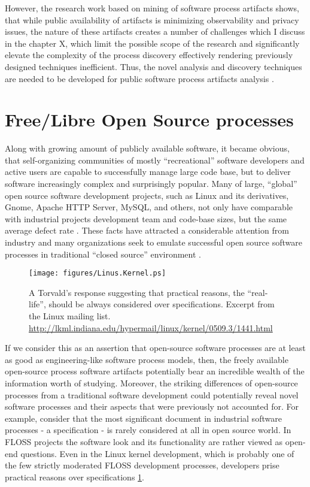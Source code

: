 However, the research work based on mining of software process artifacts shows, that while public availability 
of artifacts is minimizing observability and privacy issues, the nature of these artifacts creates a number of 
challenges which I discuss in the chapter X, which limit the possible scope of the research and significantly 
elevate the complexity of the process discovery effectively rendering previously designed techniques inefficient.
Thus, the novel analysis and discovery techniques are needed to be developed for public software process artifacts 
analysis \cite{citeulike:7853299}.

\section{Free/Libre Open Source processes}\label{floss_processes}
Along with growing amount of publicly available software, it became obvious, that self-organizing communities of 
mostly ``recreational'' software developers and active users are capable to successfully manage large code base, 
but to deliver software increasingly complex and surprisingly popular.
Many of large, ``global'' open source software development projects, such as Linux and its derivatives, 
Gnome, Apache HTTP Server, MySQL, and others, not only have comparable with industrial projects development team 
and code-base sizes, but the same average defect rate \cite{coverity2012}. 
These facts have attracted a considerable attention from industry and many organizations 
seek to emulate successful open source software processes in traditional ``closed source'' environment 
\cite{oss_virtual_organizations} \cite{oss_balance} \cite{oss_hp} \cite{oss_4industry}. 

\begin{figure}[ht!]
   \centering
   \texttt{[image: figures/Linus.Kernel.ps]}
   \caption{A Torvald's response suggesting that practical reasons, the ``real-life'', should be always considered 
   over specifications.
   Excerpt from the Linux mailing list. \url{http://lkml.indiana.edu/hypermail/linux/kernel/0509.3/1441.html}}
   \label{fig:kernel}
\end{figure}

If we consider this as an assertion that open-source software processes are at least as good as engineering-like 
software process models, then, the freely available open-source process software artifacts potentially bear an 
incredible wealth of the information worth of studying. Moreover, the striking differences of open-source processes 
from a traditional software development could potentially reveal novel software processes and their aspects that 
were previously not accounted for. 
For example, consider that the most significant document in industrial software processes - a specification - 
is rarely considered at all in open source world. In FLOSS projects the software look and its functionality are 
rather viewed as open-end questions. Even in the Linux kernel development, which is probably one of the few strictly 
moderated FLOSS development processes, developers prise practical reasons over specifications 
\ref{fig:kernel}.

